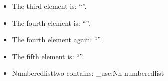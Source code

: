\documentclass{article}
\newcommand{\fourthelement}{\getnthelement{4}}
\begin{document}

\begin{itemize}
\item The third element is: ``''.
\item The fourth element is: ``\fourthelement''.
\item The fourth element again: ``\fourthelement''.
\item The fifth element is: ``''.
\item Numberedlisttwo contains: 
\seq_use:Nn numberedlist
\end{itemize}


\texttt{\meaning\playaroundelement}
\end{document}
